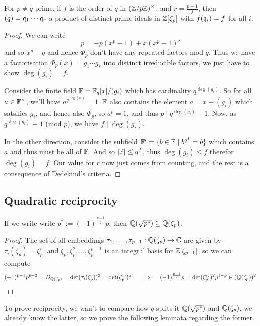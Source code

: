 \documentclass{article}
\begin{document}
\begin{theorem}
    For $p\neq q$ prime, if $f$ is the order of $q$ in $(\mathbb{Z}/p\mathbb{Z})^\times$, and $r=\frac{p-1}{f}$, then $(q)=\mathfrak{q}_1\cdots\mathfrak{q}_r$ a product of distinct prime ideals in $\mathbb{Z}[\zeta_p]$ with $f(\mathfrak{q}_i)=f$ for all $i$.\begin{proof}
        We can write \[
        p = -p(x^p-1)+x(x^p-1)'
        \] and so $x^p-q$ and hence $\Phi_p$ don't have any repeated factors mod $q$. Thus we have a factorisation $\overline{\Phi}_p(x)=g_1\cdots g_s$ into distinct irreducible factors, we just have to show $\deg(g_i)=f$.

        Consider the finite field $\mathbb{F}=\mathbb{F}_q[x]/(g_i)$ which has cardinality $q^{\deg(g_i)}$. So for all $a\in\mathbb{F}^\times$, we'll have $a^{q^{\deg(g_i)}}=1$. $\mathbb{F}$ also contains the element $a=x+(g_i)$ which satsifies $g_i$, and hence also $\overline{\Phi}_p$, so $a^p=1$, and thus $p\mid q^{\deg(g_i)}-1$. Now, as $q^{\deg(g_i)}\equiv 1$ (mod $p$), we have $f\mid \deg(g_i)$.

        In the other direction, consider the subfield $\mathbb{F}'=\{b\in\mathbb{F}\mid b^{q^f}=b\}$ which contains $a$ and thus must be all of $\mathbb{F}$. And so $\left| \mathbb{F} \right|\leq q^f$, thus $\deg(g_i)\leq f$ therefor $\deg(g_i)=f$. Our value for $r$ now just comes from counting, and the rest is a consequence of Dedekind's criteria.
    \end{proof}
\end{theorem}

\subsection{Quadratic reciprocity}

\begin{lemma}
    If we write write $p^* := (-1)^{\frac{p-1}{2}}p$, then $\mathbb{Q}(\sqrt{p^*})\subseteq \mathbb{Q}(\zeta_p)$.\begin{proof}
        The set of all embeddings $\tau_1,\ldots,\tau_{p-1}:\mathbb{Q}(\zeta_p)\rightarrow \mathbb{C}$ are given by $\tau_i(\zeta_p)=\zeta_p^i$, and $\zeta_p,\zeta_p^2,\ldots,\zeta_p^{p-1}$ is an integral basis for $\mathbb{Z}[\zeta_{p-1}]$, so we can compute \[
        (-1)^{p-1}p^{p-2} = D_{\mathbb{Q}(\zeta_p)} = \det(\tau_i(\zeta_p^j))^2 = \det(\zeta_p^{ij})^2 \quad \implies \quad (-1)^\frac{p-1}{2}p = \det(\zeta_p^{ij})^2p^{1-p}\in (\mathbb{Q}(\zeta_p))^2\qedhere
        \]
    \end{proof}
\end{lemma}

To prove reciprocity, we wan't to compare how $q$ splits it $\mathbb{Q}(\sqrt{p^*})$ and $\mathbb{Q}(\zeta_p)$, we already know the latter, so we prove the following lemmata regarding the former.
\end{document}
